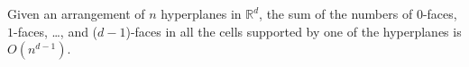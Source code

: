 \begin{theorem}\label{thm:zone-theorem-d}
Given an arrangement of \(n\) hyperplanes
%
in \(\mathbb{R}^d\),
%
the sum of the numbers of \(0\)-faces, \(1\)-faces, \dots, and (\(d-1\))-faces
%
in all the cells supported by one of the hyperplanes
%
is \(O(n^{d-1})\).
\end{theorem}
